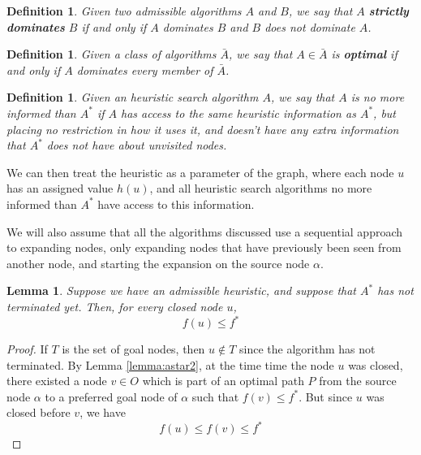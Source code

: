 \documentclass[12pt]{report}
\newtheorem{definition}[theorem]{Definition}
\newtheorem{lemma}[theorem]{Lemma}
\begin{document}
\begin{definition}
Given two admissible algorithms $A$ and $B$, we say that $A$ \textbf{strictly dominates} $B$ if and only if $A$ dominates $B$ and $B$ does not dominate $A$.
\end{definition}

\begin{definition}
Given a class of algorithms $\bar{A}$, we say that $A \in \bar{A}$ is \textbf{optimal} if and only if $A$ dominates every member of $\bar{A}$.
\end{definition}

\begin{definition}
Given an heuristic search algorithm $A$, we say that $A$ is no more informed than $A^*$ if $A$ has access to the same heuristic information as $A^*$, but placing no restriction in how it uses it, and doesn't have any extra information that $A^*$ does not have about unvisited nodes.
\end{definition}

We can then treat the heuristic as a parameter of the graph, where each node $u$ has an assigned value $h(u)$, and all heuristic search algorithms no more informed than $A^*$ have access to this information.

We will also assume that all the algorithms discussed use a sequential approach to expanding nodes, only expanding nodes that have previously been seen from another node, and starting the expansion on the source node $\alpha$.


\begin{lemma}
\label{lemma:astar-opt}
Suppose we have an admissible heuristic, and suppose that $A^*$ has not terminated yet. Then, for every closed node $u$,
\[ f(u) \leq f^* \]
\end{lemma}
\begin{proof}
If $T$ is the set of goal nodes, then $u \not \in T$ since the algorithm has not terminated. By Lemma \ref{lemma:astar2}, at the time time the node $u$ was closed, there existed a node $v \in O$ which is part of an optimal path $P$ from the source node $\alpha$ to a preferred goal node of $\alpha$ such that $f(v) \leq f^*$.
But since $u$ was closed before $v$, we have
\[ f(u) \leq f(v) \leq f^* \]
\end{proof}
\end{document}
